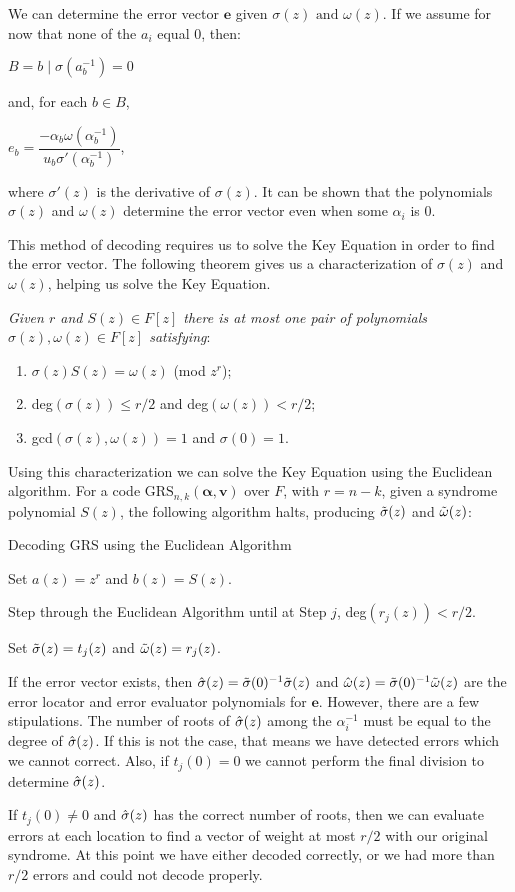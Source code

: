 \documentclass{article}
\begin{document}
We can determine the error vector $\textbf{e}$ given $\sigma(z) \text{ and } \omega(z)$. If we assume for now that none of the $a_{i}$ equal 0, then:
\begin{center}
$B = {b \mid \sigma(a_{b}^{-1}) = 0}$
\end{center}
and, for each $b \in B$,
\begin{center}
$e_{b} = \dfrac{-\alpha_{b}\omega(\alpha_{b}^{-1})}{u_{b}\sigma'(\alpha_{b}^{-1})}$,
\end{center}
where $\sigma'(z)$ is the derivative of $\sigma(z)$. It can be shown that the polynomials $\sigma(z)$ and $\omega(z)$ determine the error vector even when some $\alpha_{i}$ is 0.

This method of decoding requires us to solve the Key Equation in order to find the error vector. The following theorem gives us a characterization of $\sigma(z)$ and $\omega(z)$, helping us solve the Key Equation.

\textit{Given $r$ and $S(z) \in F[z]$ there is at most one pair of polynomials $\sigma(z),\omega(z) \in F[z]$ satisfying}:
\begin{enumerate}
	\item $\sigma(z)S(z) = \omega(z)$ (mod $z^{r}$);
	\item deg$(\sigma(z)) \le r/2$ and deg$(\omega(z)) < r/2$;
	\item gcd$(\sigma(z),\omega(z)) = 1$ and $\sigma(0) = 1$.
\end{enumerate}

Using this characterization we can solve the Key Equation using the Euclidean algorithm. For a code $\text{GRS}_{n,k}(\boldsymbol\alpha, \textbf{v})$ over $F$, with $r = n - k$, given a syndrome polynomial $S(z)$, the following algorithm halts, producing $\Tilde{\sigma}(z)$ and $\Tilde{\omega}(z)$:
\begin{algorithm}[H]
	\caption{Decoding GRS using the Euclidean Algorithm\label{decoding}}
	Set $a(z) = z^{r}$ and $b(z) = S(z)$.
	
	Step through the Euclidean Algorithm until at Step $j$, deg$(r_{j}(z)) < r/2$.
	
	Set $\Tilde{\sigma}(z) = t_{j}(z)$ and $\Tilde{\omega}(z) = r_{j}(z)$.
\end{algorithm}
If the error vector exists, then $\Hat{\sigma}(z) = \Tilde{\sigma}(0)^{-1}\Tilde{\sigma}(z)$ and $\Hat{\omega}(z) = \Tilde{\sigma}(0)^{-1}\Tilde{\omega}(z)$ are the error locator and error evaluator polynomials for $\textbf{e}$. However, there are a few stipulations. The number of roots of $\Hat{\sigma}(z)$ among the $\alpha_{i}^{-1}$ must be equal to the degree of $\Hat{\sigma}(z)$. If this is not the case, that means we have detected errors which we cannot correct. Also, if $t_{j}(0) = 0$ we cannot perform the final division to determine $\Hat{\sigma}(z)$.

If $t_{j}(0) \neq 0$ and $\Hat{\sigma}(z)$ has the correct number of roots, then we can evaluate errors at each location to find a vector of weight at most $r/2$ with our original syndrome. At this point we have either decoded correctly, or we had more than $r/2$ errors and could not decode properly.
\end{document}
